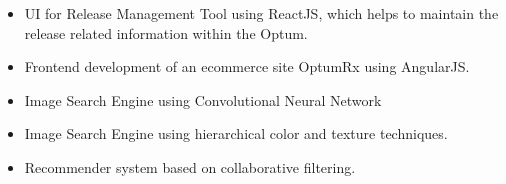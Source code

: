 \documentclass[10pt,a4paper,ragged2e]{altacv}
\begin{document}
\divider


\begin{itemize}
\item  UI for Release Management Tool using ReactJS, which helps to maintain the release related information within the Optum.

\end{itemize}

\divider


\begin{itemize}
\item  Frontend development of an ecommerce site OptumRx using AngularJS.

\end{itemize}
\divider


\begin{itemize}
\item  Image Search Engine using Convolutional Neural Network

\end{itemize}

\divider


\begin{itemize}
\item  Image Search Engine using hierarchical color and texture techniques.

\end{itemize}

\divider


\begin{itemize}
\item  Recommender system based on collaborative filtering.

\end{itemize}
\end{document}
